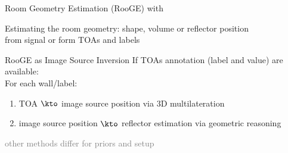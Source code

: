 \begin{frame}[t]{Room Geometry Estimation (RooGE) with \dechorate}

    \begin{block}{}
        Estimating the room geometry: shape, volume or reflector position
        \\from signal or form TOAs and labels
    \end{block}

    \begin{block}{RooGE as \alert{Image Source Inversion}}
        If TOAs annotation (label and value) are available:
        \\For each wall/label:
        \begin{enumerate}
            \item TOA $\kto$ image source position via 3D multilateration
            \item image source position $\kto$ reflector estimation via geometric reasoning
        \end{enumerate}
    {\small \textcolor{gray}{other methods differ for priors and setup~\cite{filos2011robust,antonacci2012inference,crocco2017uncalibrated}}}
    \end{block}


\end{frame}
